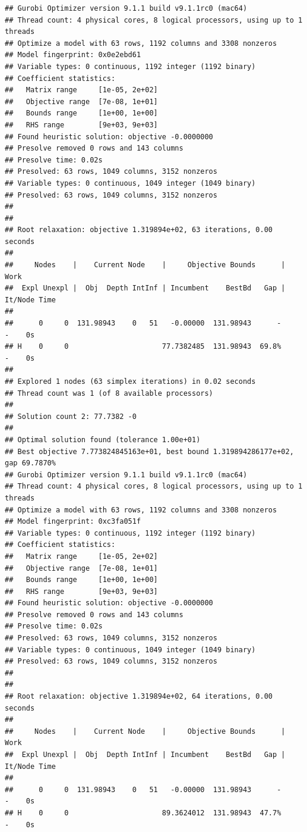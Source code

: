 \documentclass[
  12pt,
]{book}
\begin{document}
\begin{verbatim}
## Gurobi Optimizer version 9.1.1 build v9.1.1rc0 (mac64)
## Thread count: 4 physical cores, 8 logical processors, using up to 1 threads
## Optimize a model with 63 rows, 1192 columns and 3308 nonzeros
## Model fingerprint: 0x0e2ebd61
## Variable types: 0 continuous, 1192 integer (1192 binary)
## Coefficient statistics:
##   Matrix range     [1e-05, 2e+02]
##   Objective range  [7e-08, 1e+01]
##   Bounds range     [1e+00, 1e+00]
##   RHS range        [9e+03, 9e+03]
## Found heuristic solution: objective -0.0000000
## Presolve removed 0 rows and 143 columns
## Presolve time: 0.02s
## Presolved: 63 rows, 1049 columns, 3152 nonzeros
## Variable types: 0 continuous, 1049 integer (1049 binary)
## Presolved: 63 rows, 1049 columns, 3152 nonzeros
## 
## 
## Root relaxation: objective 1.319894e+02, 63 iterations, 0.00 seconds
## 
##     Nodes    |    Current Node    |     Objective Bounds      |     Work
##  Expl Unexpl |  Obj  Depth IntInf | Incumbent    BestBd   Gap | It/Node Time
## 
##      0     0  131.98943    0   51   -0.00000  131.98943      -     -    0s
## H    0     0                      77.7382485  131.98943  69.8%     -    0s
## 
## Explored 1 nodes (63 simplex iterations) in 0.02 seconds
## Thread count was 1 (of 8 available processors)
## 
## Solution count 2: 77.7382 -0 
## 
## Optimal solution found (tolerance 1.00e+01)
## Best objective 7.773824845163e+01, best bound 1.319894286177e+02, gap 69.7870%
## Gurobi Optimizer version 9.1.1 build v9.1.1rc0 (mac64)
## Thread count: 4 physical cores, 8 logical processors, using up to 1 threads
## Optimize a model with 63 rows, 1192 columns and 3308 nonzeros
## Model fingerprint: 0xc3fa051f
## Variable types: 0 continuous, 1192 integer (1192 binary)
## Coefficient statistics:
##   Matrix range     [1e-05, 2e+02]
##   Objective range  [7e-08, 1e+01]
##   Bounds range     [1e+00, 1e+00]
##   RHS range        [9e+03, 9e+03]
## Found heuristic solution: objective -0.0000000
## Presolve removed 0 rows and 143 columns
## Presolve time: 0.02s
## Presolved: 63 rows, 1049 columns, 3152 nonzeros
## Variable types: 0 continuous, 1049 integer (1049 binary)
## Presolved: 63 rows, 1049 columns, 3152 nonzeros
## 
## 
## Root relaxation: objective 1.319894e+02, 64 iterations, 0.00 seconds
## 
##     Nodes    |    Current Node    |     Objective Bounds      |     Work
##  Expl Unexpl |  Obj  Depth IntInf | Incumbent    BestBd   Gap | It/Node Time
## 
##      0     0  131.98943    0   51   -0.00000  131.98943      -     -    0s
## H    0     0                      89.3624012  131.98943  47.7%     -    0s

\end{verbatim}
\end{document}

